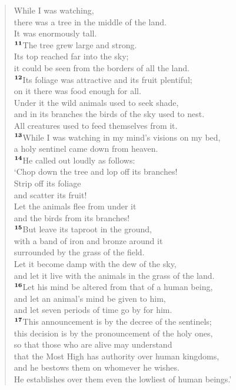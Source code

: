 \documentclass[12pt,a4paper,final]{article}
\renewcommand{\textsuperscript}[1]{\ensuremath{^{\textbf{\scriptsize #1}}}}
\begin{document}
\begin{quotation}
\noindent While I was watching, \\
there was a tree in the middle of the land. \\
It was enormously tall. \\
\textsuperscript{11}The tree grew large and strong.\\ 
Its top reached far into the sky; \\
it could be seen from the borders of all the land. \\
\textsuperscript{12}Its foliage was attractive and its fruit plentiful; \\
on it there was food enough for all. \\
Under it the wild animals used to seek shade, \\
and in its branches the birds of the sky used to nest. \\
All creatures used to feed themselves from it. \\
\textsuperscript{13}While I was watching in my mind’s visions on my bed, \\
a holy sentinel came down from heaven. \\
\textsuperscript{14}He called out loudly as follows: \\
‘Chop down the tree and lop off its branches! \\
Strip off its foliage \\
and scatter its fruit! \\
Let the animals flee from under it \\
and the birds from its branches! \\
\textsuperscript{15}But leave its taproot in the ground, \\
with a band of iron and bronze around it \\
surrounded by the grass of the field. \\
Let it become damp with the dew of the sky, \\
and let it live with the animals in the grass of the land. \\
\textsuperscript{16}Let his mind be altered from that of a human being, \\
and let an animal’s mind be given to him, \\
and let seven periods of time go by for him. \\
\textsuperscript{17}This announcement is by the decree of the sentinels; \\
this decision is by the pronouncement of the holy ones, \\
so that those who are alive may understand \\
that the Most High has authority over human kingdoms, \\
and he bestows them on whomever he wishes. \\
He establishes over them even the lowliest of human beings.’ \\

\end{quotation}
\end{document}
